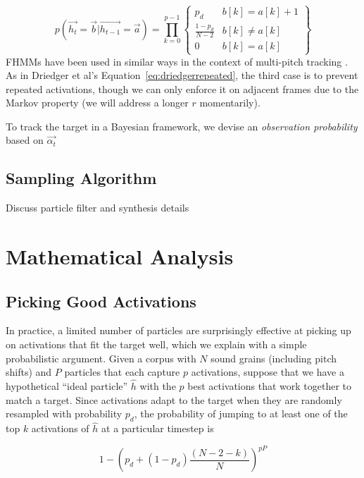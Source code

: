 \documentclass{article}
\begin{document}
		\begin{equation}
        	p(\vec{h_t} = \vec{b} | \vec{h_{t-1}} = \vec{a}) = \prod_{k=0}^{p-1} \left\{  \begin{array}{cc}  p_d & b[k] = a[k]+1  \\ \frac{1-p_d}{N-2} & b[k] \neq a[k] \\ 0 & b[k] = a[k] \end{array} \right\}
		\end{equation}
        FHMMs have been used in similar ways in the context of multi-pitch tracking \cite{wohlmayr2010probabilistic}. As in Driedger et al's Equation~\ref{eq:driedgerrepeated}, the third case is to prevent repeated activations, though we can only enforce it on adjacent frames due to the Markov property (we will address a longer $r$ momentarily). 
        
        To track the target in a Bayesian framework, we devise an {\em observation probability} based on $\vec{\alpha_t}$


\subsection{Sampling Algorithm}
\label{sec:sampling}

Discuss particle filter and synthesis details


\section{Mathematical Analysis}

\subsection{Picking Good Activations}

In practice, a limited number of particles are surprisingly effective at picking up on activations that fit the target well, which we explain with a simple probabilistic argument.  Given a corpus with $N$ sound grains (including pitch shifts) and $P$ particles that each capture $p$ activations, suppose that we have a hypothetical ``ideal particle'' $\hat{h}$ with the $p$ best activations that work together to match a target.  Since activations adapt to the target when they are randomly resampled with probability $p_d$, the probability of jumping to at least one of the top $k$ activations of $\hat{h}$ at a particular timestep is 

\begin{equation}
    \label{eq:timeadjacentprob}
    1 - \left( p_d + (1-p_d) \frac{(N-2-k)}{N} \right)^{pP}
\end{equation}
\end{document}

